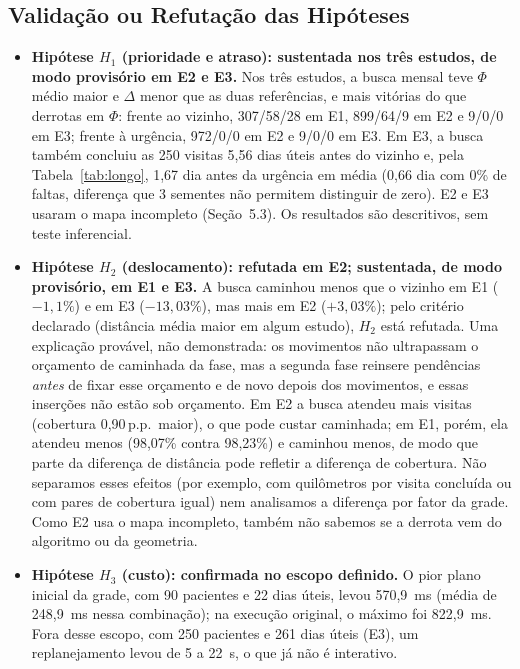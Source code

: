 \documentclass[11pt,a4paper]{article}
\newcommand{\pp}{\,p.p.}
\begin{document}
\subsection{Validação ou Refutação das Hipóteses}
\begin{itemize}
    \item \textbf{Hipótese $H_1$ (prioridade e atraso): sustentada nos três estudos, de modo provisório em E2 e E3.} Nos três estudos, a busca mensal teve $\Phi$ médio maior e $\Delta$ menor que as duas referências, e mais vitórias do que derrotas em $\Phi$: frente ao vizinho, 307/58/28 em E1, 899/64/9 em E2 e 9/0/0 em E3; frente à urgência, 972/0/0 em E2 e 9/0/0 em E3. Em E3, a busca também concluiu as 250 visitas 5,56 dias úteis antes do vizinho e, pela Tabela~\ref{tab:longo}, 1,67 dia antes da urgência em média (0,66 dia com 0\% de faltas, diferença que 3 sementes não permitem distinguir de zero). E2 e E3 usaram o mapa incompleto (Seção~5.3). Os resultados são descritivos, sem teste inferencial.
    \item \textbf{Hipótese $H_2$ (deslocamento): refutada em E2; sustentada, de modo provisório, em E1 e E3.} A busca caminhou menos que o vizinho em E1 ($-1{,}1\%$) e em E3 ($-13{,}03\%$), mas mais em E2 ($+3{,}03\%$); pelo critério declarado (distância média maior em algum estudo), $H_2$ está refutada. Uma explicação provável, não demonstrada: os movimentos não ultrapassam o orçamento de caminhada da fase, mas a segunda fase reinsere pendências \emph{antes} de fixar esse orçamento e de novo depois dos movimentos, e essas inserções não estão sob orçamento. Em E2 a busca atendeu mais visitas (cobertura 0,90\pp\ maior), o que pode custar caminhada; em E1, porém, ela atendeu menos (98,07\% contra 98,23\%) e caminhou menos, de modo que parte da diferença de distância pode refletir a diferença de cobertura. Não separamos esses efeitos (por exemplo, com quilômetros por visita concluída ou com pares de cobertura igual) nem analisamos a diferença por fator da grade. Como E2 usa o mapa incompleto, também não sabemos se a derrota vem do algoritmo ou da geometria.
    \item \textbf{Hipótese $H_3$ (custo): confirmada no escopo definido.} O pior plano inicial da grade, com 90 pacientes e 22 dias úteis, levou 570,9~ms (média de 248,9~ms nessa combinação); na execução original, o máximo foi 822,9~ms. Fora desse escopo, com 250 pacientes e 261 dias úteis (E3), um replanejamento levou de 5 a 22~s, o que já não é interativo.

\end{itemize}
\end{document}
